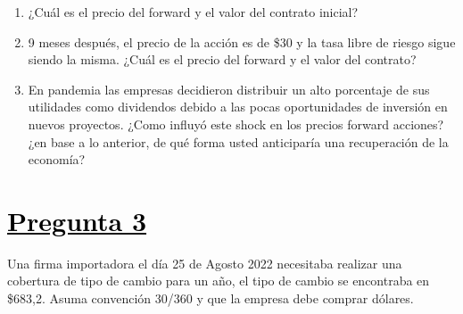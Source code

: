 \documentclass[12pt]{article}
\newcommand{\subrayadoRojo}[1]{{\color{rojoudp}\underline{\textcolor{black}{#1}}}}
\begin{document}
\begin{enumerate}[label=\textbf{\alph*)}]
\item   ¿Cuál es el precio del forward y el valor del contrato inicial?
\item   9 meses después, el precio de la acción es de \$30 y la tasa libre de riesgo sigue siendo la misma.
 ¿Cuál es el precio del forward y el valor del contrato?
\item   En pandemia las empresas decidieron distribuir un alto porcentaje de sus utilidades como dividendos 
debido a las pocas oportunidades de inversión en nuevos proyectos. ¿Como influyó este shock en los precios 
forward acciones? ¿en base a lo anterior, de qué forma usted anticiparía una recuperación de la economía?
\end{enumerate}

\vspace{1em}
\section*{\subrayadoRojo{Pregunta 3}}
Una firma importadora el día 25 de Agosto 2022 necesitaba realizar una cobertura de tipo de cambio 
para un año, el tipo de cambio se encontraba en \$683,2. Asuma convención 30/360 y que la empresa debe comprar dólares.
\end{document}

